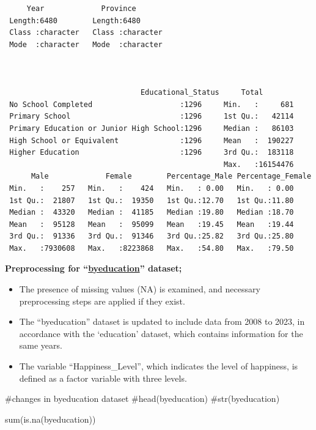 \documentclass[
  11pt,
  a4paper,
  DIV=11,
  numbers=noendperiod]{scrartcl}
\newenvironment{Shaded}{\begin{snugshade}}{\end{snugshade}}
\newcommand{\CommentTok}[1]{\textcolor[rgb]{0.37,0.37,0.37}{#1}}
\newcommand{\FunctionTok}[1]{\textcolor[rgb]{0.28,0.35,0.67}{#1}}
\newcommand{\NormalTok}[1]{\textcolor[rgb]{0.00,0.23,0.31}{#1}}
\begin{document}
\begin{verbatim}
     Year             Province        
 Length:6480        Length:6480       
 Class :character   Class :character  
 Mode  :character   Mode  :character  
                                      
                                      
                                      
                               Educational_Status     Total         
 No School Completed                    :1296     Min.   :     681  
 Primary School                         :1296     1st Qu.:   42114  
 Primary Education or Junior High School:1296     Median :   86103  
 High School or Equivalent              :1296     Mean   :  190227  
 Higher Education                       :1296     3rd Qu.:  183118  
                                                  Max.   :16154476  
      Male             Female        Percentage_Male Percentage_Female
 Min.   :    257   Min.   :    424   Min.   : 0.00   Min.   : 0.00    
 1st Qu.:  21807   1st Qu.:  19350   1st Qu.:12.70   1st Qu.:11.80    
 Median :  43320   Median :  41185   Median :19.80   Median :18.70    
 Mean   :  95128   Mean   :  95099   Mean   :19.45   Mean   :19.44    
 3rd Qu.:  91336   3rd Qu.:  91346   3rd Qu.:25.82   3rd Qu.:25.80    
 Max.   :7930608   Max.   :8223868   Max.   :54.80   Max.   :79.50    
\end{verbatim}

\textbf{Preprocessing for
``\href{https://github.com/emu-hacettepe-analytics/emu660-spring2025-ecavusgil}{byeducation}''
dataset;}

\begin{itemize}
\item
  The presence of missing values (NA) is examined, and necessary
  preprocessing steps are applied if they exist.
\item
  The ``byeducation'' dataset is updated to include data from 2008 to
  2023, in accordance with the `education' dataset, which contains
  information for the same years.
\item
  The variable ``Happiness\_Level'', which indicates the level of
  happiness, is defined as a factor variable with three levels.
\end{itemize}

\begin{Shaded}
\begin{Highlighting}[]
\CommentTok{\#changes in byeducation dataset}
\CommentTok{\#head(byeducation)}
\CommentTok{\#str(byeducation)}


\FunctionTok{sum}\NormalTok{(}\FunctionTok{is.na}\NormalTok{(byeducation))}
\end{Highlighting}
\end{Shaded}
\end{document}
